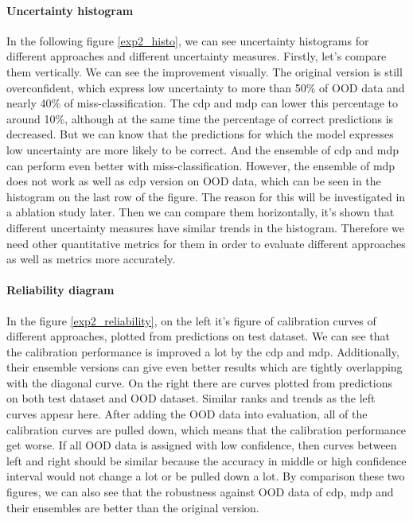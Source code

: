 \paragraph{Uncertainty histogram}
In the following figure \ref{exp2_histo}, we can see uncertainty histograms for different approaches and different uncertainty measures. Firstly, let's compare them vertically. We can see the improvement visually. The original version is still overconfident, which express low uncertainty to more than 50$\%$ of OOD data and nearly 40\% of miss-classification. The  cdp and mdp can lower this percentage to around 10\%, although at the same time the percentage of correct predictions is decreased. But we can know that the predictions for which the model expresses low uncertainty are more likely to be correct. And the ensemble of cdp and mdp can perform even better with miss-classification. However, the ensemble of mdp does not work as well as cdp version on OOD data, which can be seen in the histogram on the last row of the figure. The reason for this will be investigated in a ablation study later. Then we can compare them horizontally, it's shown that different uncertainty measures have similar trends in the histogram. Therefore we need other quantitative metrics for them in order to evaluate different approaches as well as metrics more accurately.  
\paragraph{Reliability diagram}
In the figure \ref{exp2_reliability}, on the left it's figure of calibration curves of different approaches, plotted from predictions on test dataset. We can see that the calibration performance is improved a lot by the cdp and mdp. Additionally, their ensemble versions can give even better results which are tightly overlapping with the diagonal curve. On the right there are curves plotted from predictions on both test dataset and OOD dataset. Similar ranks and trends as the left curves appear here. After adding the OOD data into evaluation, all of the calibration curves are pulled down, which means that the calibration performance get worse. If all OOD data is assigned with low confidence, then curves between left and right should be similar because the accuracy in middle or high confidence interval would not change a lot or be pulled down a lot. By comparison these two figures, we can also see that the robustness against OOD data of cdp, mdp and their ensembles are better than the original version.

